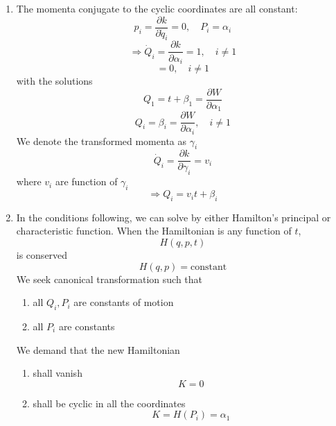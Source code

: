 \documentclass{article}
\begin{document}
\begin{enumerate}
		\item The momenta conjugate to the cyclic coordinates are all constant:
		\[
		p_i = \frac{\partial k}{\partial \dot{q}_i} = 0, \quad P_i = \alpha_i
		\]
		\[
		\Rightarrow \dot{Q}_i = \frac{\partial k}{\partial \alpha_i} = 1, \quad i \neq 1
		\]
		\[
		= 0, \quad i \neq 1
		\]
		with the solutions
		\[
		Q_1 = t + \beta_1 = \frac{\partial W}{\partial \alpha_1}
		\]
		\[
		Q_i = \beta_i = \frac{\partial W}{\partial \alpha_i}, \quad i \neq 1
		\]
		We denote the transformed momenta as $\gamma_i$
		\[
		\dot{Q}_i = \frac{\partial k}{\partial \gamma_i} = v_i
		\]
		where $v_i$ are function of $\gamma_i$
		\[
		\Rightarrow Q_i = v_i t + \beta_i
		\]
		
		\item In the conditions following, we can solve by either Hamilton's principal or characteristic function.
		When the Hamiltonian is any function of $t$,
		\[
		H(q, p, t)
		\]
		is conserved
		\[
		H(q, p) = \text{constant}
		\]
		We seek canonical transformation such that
		\begin{enumerate}
			\item all $Q_i, P_i$ are constants of motion
			\item all $P_i$ are constants
		\end{enumerate}
		We demand that the new Hamiltonian
		\begin{enumerate}
			\item shall vanish
			\[
			K=0
			\]
			\item shall be cyclic in all the coordinates
			\[
			K=H(P_i) = \alpha_1
			\]
		\end{enumerate}
		

\end{enumerate}
\end{document}
